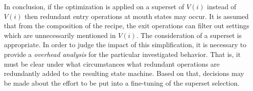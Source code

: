 \documentclass[12pt,a4paper]{scrartcl}
\begin{document}
In conclusion, if the optimization is applied on a superset of $V(i)$ instead
of $V(i)$ then redundant entry operations at mouth states may occur. It is
assumed that from the composition of the recipe, the exit operations can filter
out settings which are unnecessarily mentioned in $V(i)$. The consideration of
a superset is appropriate. In order to judge the impact of this simplification,
it is necessary to provide a \textit{overhead analysis} for the particular
investigated behavior. That is, it must be clear under what circumstances what
redundant operations are redundantly added to the resulting state machine.
Based on that, decisions may be made about the effort to be put into a
fine-tuning of the superset selection.
\end{document}
